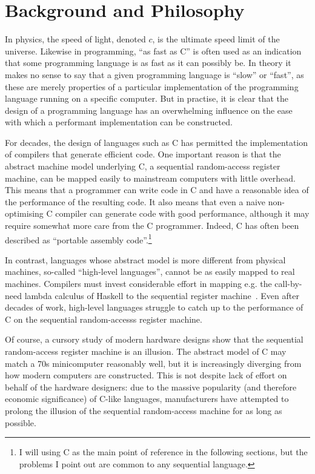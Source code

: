 \chapter{Background and Philosophy}
\label{chap:philosophy}

In physics, the speed of light, denoted $c$, is the ultimate speed
limit of the universe.  Likewise in programming, ``as fast as C'' is
often used as an indication that some programming language is as fast
as it can possibly be.  In theory it makes no sense to say that a
given programming language is ``slow'' or ``fast'', as these are
merely properties of a particular implementation of the programming
language running on a specific computer.  But in practise, it is clear
that the design of a programming language has an overwhelming
influence on the ease with which a performant implementation can be
constructed.

For decades, the design of languages such as C has permitted the
implementation of compilers that generate efficient code.  One
important reason is that the abstract machine model underlying C, a
sequential random-access register machine, can be mapped easily to
mainstream computers with little overhead.  This means that a
programmer can write code in C and have a reasonable idea of the
performance of the resulting code.  It also means that even a naive
non-optimising C compiler can generate code with good performance,
although it may require somewhat more care from the C programmer.
Indeed, C has often been described as ``portable assembly
code''.\footnote{I will using C as the main point of reference in the
  following sections, but the problems I point out are common to any
  sequential language.}

In contrast, languages whose abstract model is more different from
physical machines, so-called ``high-level languages'', cannot be as
easily mapped to real machines.  Compilers must invest considerable
effort in mapping e.g. the call-by-need lambda calculus of Haskell to
the sequential register machine~\cite{jones1992implementing}.  Even
after decades of work, high-level languages struggle to catch up to
the performance of C on the sequential random-accesss register
machine.

Of course, a cursory study of modern hardware designs show that the
sequential random-access register machine is an illusion.  The abstract
model of C may match a 70s minicomputer reasonably well, but it is
increasingly diverging from how modern computers are constructed.
This is not despite lack of effort on behalf of the hardware
designers: due to the massive popularity (and therefore economic
significance) of C-like languages, manufacturers have attempted to
prolong the illusion of the sequential random-access machine for as long as
possible.

